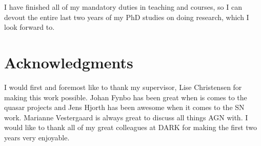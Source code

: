 I have finished all of my mandatory duties in teaching and courses, so I can
devout the entire last two years of my PhD studies on doing research, which I
look forward to.


\section{Acknowledgments}
I would first and foremost like to thank my supervisor, Lise Christensen for
making this work possible. Johan Fynbo has been great when is comes to the
quasar projects and Jens Hjorth has been awesome when it comes to the SN work.
Marianne Vestergaard is always great to discuss all things AGN with. I would
like to thank all of my great colleagues at DARK for making the first two years
very enjoyable.


